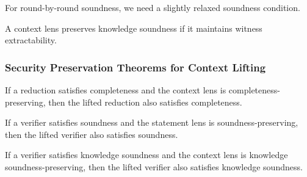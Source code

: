 \begin{definition}
    \label{def:statement_lens_is_rbr_sound}
    For round-by-round soundness, we need a slightly relaxed soundness condition.
\end{definition}

\begin{definition}
    \label{def:context_lens_is_knowledge_sound}
    A context lens preserves knowledge soundness if it maintains witness extractability.
\end{definition}

\subsubsection{Security Preservation Theorems for Context Lifting}

\begin{theorem}
    \label{thm:lift_context_completeness}
    If a reduction satisfies completeness and the context lens is completeness-preserving, then the lifted reduction also satisfies completeness.
\end{theorem}

\begin{theorem}
    \label{thm:lift_context_soundness}
    If a verifier satisfies soundness and the statement lens is soundness-preserving, then the lifted verifier also satisfies soundness.
\end{theorem}

\begin{theorem}
    \label{thm:lift_context_knowledge_soundness}
    If a verifier satisfies knowledge soundness and the context lens is knowledge soundness-preserving, then the lifted verifier also satisfies knowledge soundness.
\end{theorem}

